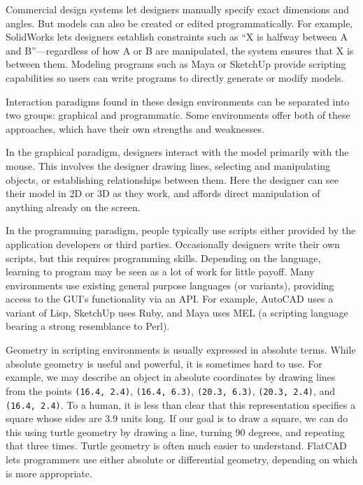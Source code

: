 \documentclass[times, 10pt,twocolumn]{article}
\begin{document}
Commercial design systems let designers manually specify exact
dimensions and angles. But models can also be created or edited
programmatically. For example, \nohyphens{SolidWorks} lets designers
establish constraints such as ``X is halfway between A and
B''---regardless of how A or B are manipulated, the system ensures
that X is between them. Modeling programs such as Maya or SketchUp
provide scripting capabilities so users can write programs to directly
generate or modify models.

Interaction paradigms found in these design environments can be
separated into two groups: graphical and programmatic. Some
environments offer both of these approaches, which have their own
strengths and weaknesses.

In the graphical paradigm, designers interact with the model primarily
with the mouse. This involves the designer drawing lines, selecting
and manipulating objects, or establishing relationships between
them. Here the designer can see their model in 2D or 3D as they work,
and affords direct manipulation of anything already on the screen.

In the programming paradigm, people typically use scripts either
provided by the application developers or third parties. Occasionally
designers write their own scripts, but this requires programming
skills. Depending on the language, learning to program may be seen as
a lot of work for little payoff. Many environments use existing
general purpose languages (or variants), providing access to the GUI's
functionality via an API. For example, AutoCAD uses a variant of Lisp,
SketchUp uses Ruby, and Maya uses MEL (a scripting language bearing a
strong resemblance to Perl).

Geometry in scripting environments is usually expressed in absolute
terms. While absolute geometry is useful and powerful, it is sometimes
hard to use. For example, we may describe an object in absolute
coordinates by drawing lines from the points \textnhtt{(16.4,~2.4)},
\textnhtt{(16.4,~6.3)}, \textnhtt{(20.3,~6.3)},
\textnhtt{(20.3,~2.4)}, and \textnhtt{(16.4,~2.4)}. To a human, it is
less than clear that this representation specifies a square whose
sides are 3.9 units long. If our goal is to draw a square, we can do
this using turtle geometry by drawing a line, turning 90 degrees, and
repeating that three times. Turtle geometry is often much easier to
understand. \nohyphens{FlatCAD} lets programmers use either absolute
or differential geometry, depending on which is more appropriate.
\end{document}
